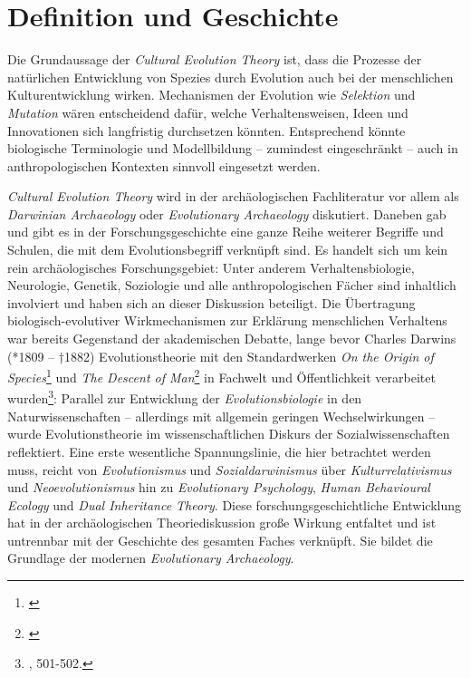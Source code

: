 \documentclass[openany,twoside,twocolumn]{book}
\let\rmarkdownfootnote\footnote%
\def\footnote{\protect\rmarkdownfootnote}
\begin{document}
\hypertarget{definition-und-geschichte}{%
\section{Definition und Geschichte}\label{definition-und-geschichte}}

Die Grundaussage der \emph{Cultural Evolution Theory} ist, dass die Prozesse der natürlichen Entwicklung von Spezies durch Evolution auch bei der menschlichen Kulturentwicklung wirken. Mechanismen der Evolution wie \emph{Selektion} und \emph{Mutation} wären entscheidend dafür, welche Verhaltensweisen, Ideen und Innovationen sich langfristig durchsetzen könnten. Entsprechend könnte biologische Terminologie und Modellbildung -- zumindest eingeschränkt -- auch in anthropologischen Kontexten sinnvoll eingesetzt werden.

\emph{Cultural Evolution Theory} wird in der archäologischen Fachliteratur vor allem als \emph{Darwinian Archaeology} oder \emph{Evolutionary Archaeology} diskutiert. Daneben gab und gibt es in der Forschungsgeschichte eine ganze Reihe weiterer Begriffe und Schulen, die mit dem Evolutionsbegriff verknüpft sind. Es handelt sich um kein rein archäologisches Forschungsgebiet: Unter anderem Verhaltensbiologie, Neurologie, Genetik, Soziologie und alle anthropologischen Fächer sind inhaltlich involviert und haben sich an dieser Diskussion beteiligt. Die Übertragung biologisch-evolutiver Wirkmechanismen zur Erklärung menschlichen Verhaltens war bereits Gegenstand der akademischen Debatte, lange bevor Charles Darwins (*1809 -- †1882) Evolutionstheorie mit den Standardwerken \emph{On the Origin of Species}\footnote{\textcite{Darwinoriginspeciesmeans1859}} und \emph{The Descent of Man}\footnote{\textcite{Darwindescentmanselection1871}} in Fachwelt und Öffentlichkeit verarbeitet wurden\footnote{\textcite{petermann_geschichte_2004}, 501-502.}: Parallel zur Entwicklung der \emph{Evolutionsbiologie} in den Naturwissenschaften -- allerdings mit allgemein geringen Wechselwirkungen -- wurde Evolutionstheorie im wissenschaftlichen Diskurs der Sozialwissenschaften reflektiert. Eine erste wesentliche Spannungslinie, die hier betrachtet werden muss, reicht von \emph{Evolutionismus} und \emph{Sozialdarwinismus} über \emph{Kulturrelativismus} und \emph{Neoevolutionismus} hin zu \emph{Evolutionary Psychology}, \emph{Human Behavioural Ecology} und \emph{Dual Inheritance Theory}. Diese forschungsgeschichtliche Entwicklung hat in der archäologischen Theoriediskussion große Wirkung entfaltet und ist untrennbar mit der Geschichte des gesamten Faches verknüpft. Sie bildet die Grundlage der modernen \emph{Evolutionary Archaeology}.
\end{document}
